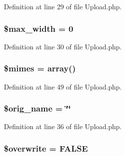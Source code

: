 Definition at line 29 of file Upload.\-php.

\hypertarget{class_c_i___upload_a7f6a5db40a5fd00c8babbd37480b00fc}{
\subsubsection[{\$max\-\_\-width}]{\setlength{\rightskip}{0pt plus 5cm}\$max\-\_\-width = 0}}\label{class_c_i___upload_a7f6a5db40a5fd00c8babbd37480b00fc}


Definition at line 30 of file Upload.\-php.

\hypertarget{class_c_i___upload_a2ce7d338d1fd0f0d971ba6213ac298a2}{
\subsubsection[{\$mimes}]{\setlength{\rightskip}{0pt plus 5cm}\$mimes = array()}}\label{class_c_i___upload_a2ce7d338d1fd0f0d971ba6213ac298a2}


Definition at line 49 of file Upload.\-php.

\hypertarget{class_c_i___upload_a2704f7723b97b03285de219442ae3e2b}{
\subsubsection[{\$orig\-\_\-name}]{\setlength{\rightskip}{0pt plus 5cm}\$orig\-\_\-name = \char`\"{}\char`\"{}}}\label{class_c_i___upload_a2704f7723b97b03285de219442ae3e2b}


Definition at line 36 of file Upload.\-php.

\hypertarget{class_c_i___upload_a8d31b0ad9cccde7e2d857097672ed6cf}{
\subsubsection[{\$overwrite}]{\setlength{\rightskip}{0pt plus 5cm}\$overwrite = F\-A\-L\-S\-E}}\label{class_c_i___upload_a8d31b0ad9cccde7e2d857097672ed6cf}


